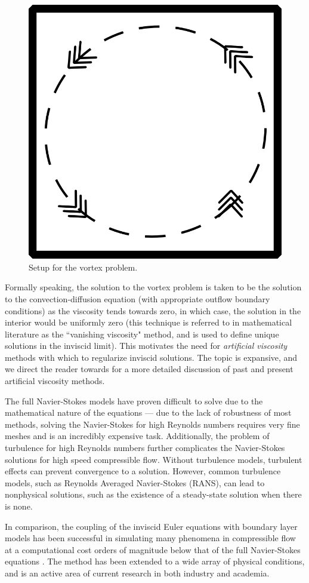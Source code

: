 \begin{figure}[!h]
\centering
\includegraphics[scale = .22]{figs/convCirc.png}
\caption{Setup for the vortex problem.}
\label{fig:convCirc}
\end{figure}
Formally speaking, the solution to the vortex problem is taken to be the solution to the convection-diffusion equation (with appropriate outflow boundary conditions) as the viscosity tends towards zero, in which case, the solution in the interior would be uniformly zero (this technique is referred to in mathematical literature as the ``vanishing viscosity" method, and is used to define unique solutions in the inviscid limit).  This motivates the need for \emph{artificial viscosity} methods with which to regularize inviscid solutions.  The topic is expansive, and we direct the reader towards \cite{Barter} for a more detailed discussion of past and present artificial viscosity methods. 

The full Navier-Stokes models have proven difficult to solve due to the mathematical nature of the equations --- due to the lack of robustness of most methods, solving the Navier-Stokes for high Reynolds numbers requires very fine meshes and is an incredibly expensive task.  Additionally, the problem of turbulence for high Reynolds numbers further complicates the Navier-Stokes solutions for high speed compressible flow.  Without turbulence models, turbulent effects can prevent convergence to a solution.  However, common turbulence models, such as Reynolds Averaged Navier-Stokes (RANS), can lead to nonphysical solutions, such as the existence of a steady-state solution when there is none.  

In comparison, the coupling of the inviscid Euler equations with boundary layer models has been successful in simulating many phenomena in compressible flow at a computational cost orders of magnitude below that of the full Navier-Stokes equations \cite{BoeingDrela}.  The method has been extended to a wide array of physical conditions, and is an active area of current research in both industry and academia.  
